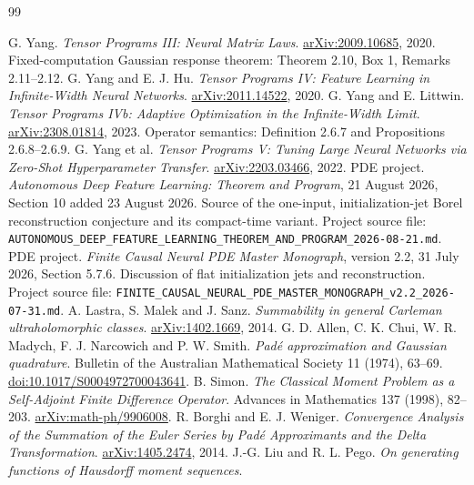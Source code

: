 \begin{thebibliography}{99}
\raggedright
{} G. Yang. \emph{Tensor Programs III: Neural Matrix Laws}.
\href{https://arxiv.org/abs/2009.10685}{arXiv:2009.10685}, 2020.
Fixed-computation Gaussian response theorem: Theorem 2.10, Box 1,
Remarks 2.11--2.12.
 G. Yang and E. J. Hu. \emph{Tensor Programs IV: Feature Learning in Infinite-Width Neural Networks}.
\href{https://arxiv.org/abs/2011.14522}{arXiv:2011.14522}, 2020.
 G. Yang and E. Littwin. \emph{Tensor Programs IVb: Adaptive Optimization in the Infinite-Width Limit}.
\href{https://arxiv.org/abs/2308.01814}{arXiv:2308.01814}, 2023.
Operator semantics: Definition 2.6.7 and Propositions 2.6.8--2.6.9.
 G. Yang et al. \emph{Tensor Programs V: Tuning Large Neural Networks via Zero-Shot Hyperparameter Transfer}.
\href{https://arxiv.org/abs/2203.03466}{arXiv:2203.03466}, 2022.
 PDE project.
\emph{Autonomous Deep Feature Learning: Theorem and Program},
21 August 2026, Section 10 added 23 August 2026.
Source of the one-input, initialization-jet Borel reconstruction conjecture
and its compact-time variant. Project source file:
\nolinkurl{AUTONOMOUS_DEEP_FEATURE_LEARNING_THEOREM_AND_PROGRAM_2026-08-21.md}.
 PDE project.
\emph{Finite Causal Neural PDE Master Monograph}, version 2.2,
31 July 2026, Section 5.7.6.
Discussion of flat initialization jets and reconstruction.
Project source file:
\nolinkurl{FINITE_CAUSAL_NEURAL_PDE_MASTER_MONOGRAPH_v2.2_2026-07-31.md}.
 A. Lastra, S. Malek and J. Sanz.
\emph{Summability in general Carleman ultraholomorphic classes}.
\href{https://arxiv.org/abs/1402.1669}{arXiv:1402.1669}, 2014.
 G. D. Allen, C. K. Chui, W. R. Madych,
F. J. Narcowich and P. W. Smith.
\emph{Pad\'e approximation and Gaussian quadrature}.
Bulletin of the Australian Mathematical Society 11 (1974), 63--69.
\href{https://doi.org/10.1017/S0004972700043641}{doi:10.1017/S0004972700043641}.
 B. Simon.
\emph{The Classical Moment Problem as a Self-Adjoint Finite Difference Operator}.
Advances in Mathematics 137 (1998), 82--203.
\href{https://arxiv.org/abs/math-ph/9906008}{arXiv:math-ph/9906008}.
 R. Borghi and E. J. Weniger.
\emph{Convergence Analysis of the Summation of the Euler Series by Pad\'e
Approximants and the Delta Transformation}.
\href{https://arxiv.org/abs/1405.2474}{arXiv:1405.2474}, 2014.
 J.-G. Liu and R. L. Pego.
\emph{On generating functions of Hausdorff moment sequences}.

\end{thebibliography}
